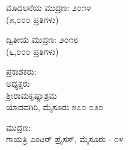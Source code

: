 \thispagestyle{empty}

\begin{center}
ಮೊದಲನೆಯ ಮುದ್ರಣ: ೨೦೧೪\\(೫,೦೦೦ ಪ್ರತಿಗಳು)
\end{center}

\begin{center}
ದ್ವಿತೀಯ ಮುದ್ರಣ: ೨೦೧೮\\(೬,೦೦೦ ಪ್ರತಿಗಳು)
\end{center}

\begin{center}
ಪ್ರಕಾಶಕರು: \\ಅಧ್ಯಕ್ಷರು\\ಶ್ರೀರಾಮಕೃಷ್ಣಾಶ್ರಮ\\ಯಾದವಗಿರಿ, ಮೈಸೂರು ೫೭೦ ೦೨೦
\end{center}

\begin{center}
ಮುದ್ರಣ: \\ಗಾಯತ್ರಿ ಎಂಟರ್ ಪ್ರೈಸಸ್, ಮೈಸೂರು - ೦೪
\end{center}


